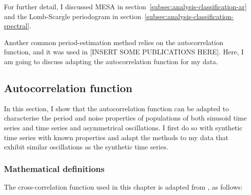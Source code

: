 For further detail, I discussed MESA in section~\ref{subsec:analysis-classification-ar} and the Lomb-Scargle periodogram in section~\ref{subsec:analysis-classification-spectral}.

Another common period-estimation method relies on the autocorrelation function, and it was used in [INSERT SOME PUBLICATIONS HERE].
Here, I am going to discuss adapting the autocorrelation function for my data.

\subsection{Autocorrelation function}
\label{subsec:analysis-characterisation-acf}

In this section, I show that the autocorrelation function can be adapted to characterise the period and noise properties of populations of both sinusoid time series and time series and asymmetrical oscillations.
I first do so with synthetic time series with known properties and adapt the methods to my data that exhibit similar oscillations as the synthetic time series.

\subsubsection{Mathematical definitions}
\label{subsubsec:analysis-characterisation-acf-maths}

The cross-correlation function used in this chapter is adapted from \textcite{pietschDeterminingGrowthRates2023}, as follows:

